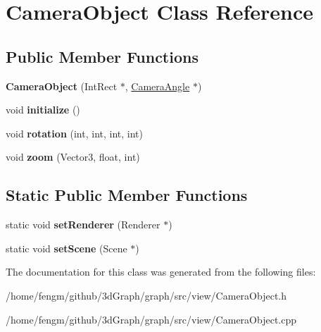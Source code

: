 \hypertarget{class_camera_object}{}\section{Camera\+Object Class Reference}
\label{class_camera_object}
\subsection*{Public Member Functions}
\begin{DoxyCompactItemize}
\item 
\mbox{\label{class_camera_object_aedcb384d9c064708399d86d0b077e43e}} 
{\bfseries Camera\+Object} (Int\+Rect $\ast$, \mbox{\hyperlink{class_camera_angle}{Camera\+Angle}} $\ast$)
\item 
\mbox{\label{class_camera_object_ae393c9d833ebe15b5cee5d70aafb5f66}} 
void {\bfseries initialize} ()
\item 
\mbox{\label{class_camera_object_a7034b44b257496fa83e3f32acfefa136}} 
void {\bfseries rotation} (int, int, int, int)
\item 
\mbox{\label{class_camera_object_a65e62172b8cb8bd5b1b034ee0a73d252}} 
void {\bfseries zoom} (Vector3, float, int)
\end{DoxyCompactItemize}
\subsection*{Static Public Member Functions}
\begin{DoxyCompactItemize}
\item 
\mbox{\label{class_camera_object_a25c1afeb729647f28fe00c22f2d7e16d}} 
static void {\bfseries set\+Renderer} (Renderer $\ast$)
\item 
\mbox{\label{class_camera_object_a349533befed1ded2e8b1efa40016ce10}} 
static void {\bfseries set\+Scene} (Scene $\ast$)
\end{DoxyCompactItemize}


The documentation for this class was generated from the following files\+:\begin{DoxyCompactItemize}
\item 
/home/fengm/github/3d\+Graph/graph/src/view/Camera\+Object.\+h\item 
/home/fengm/github/3d\+Graph/graph/src/view/Camera\+Object.\+cpp\end{DoxyCompactItemize}
